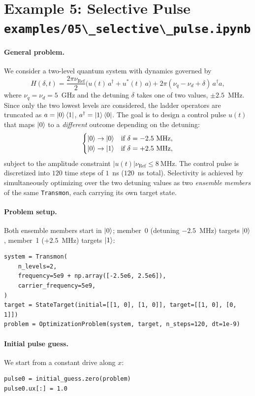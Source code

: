 \documentclass[a4paper,12pt]{article}
\DeclareMathOperator{\R}{Ref}
\newcommand{\mcode}[1]{\protect\lstinline[basicstyle=\color{black}\ttfamily]!#1!}
\begin{document}
\newpage
\section*{Example 5: Selective Pulse\\
\mcode{examples/05\_selective\_pulse.ipynb}}
{}

\paragraph*{General problem.}
We consider a two-level quantum system with dynamics governed by
\[
    H(\delta,t) = \frac{2\pi \nu_{\R}}{2}\big( u(t)\,a^{\dagger} + u^{*}(t)\,a \big)
    + 2\pi(\nu_q - \nu_d + \delta)\,a^{\dagger}a,
\]
where $\nu_q = \nu_d = 5$~GHz and the detuning $\delta$ takes one of two
values, $\pm 2.5$~MHz. Since only the two lowest levels are considered, the
ladder operators are truncated as $a=\ket{0}\bra{1}$,
$a^{\dagger}=\ket{1}\bra{0}$. The goal is to design a control pulse $u(t)$
that maps $\ket{0}$ to a \emph{different} outcome depending on the
detuning:
\[\begin{cases}
   \ket{0}\to\ket{0} & \text{if } \delta = -2.5~\mathrm{MHz}, \\
   \ket{0}\to\ket{1} & \text{if } \delta = +2.5~\mathrm{MHz},
\end{cases}
\]
subject to the amplitude constraint $|u(t)|\nu_{\R}\leq 8~\mathrm{MHz}$. The
control pulse is discretized into $120$ time steps of $1$~ns ($120$~ns
total). Selectivity is achieved by simultaneously optimizing over the two
detuning values as two \emph{ensemble members} of the same \mcode{Transmon},
each carrying its own target state.

\paragraph*{Problem setup.} Both ensemble members start in $\ket{0}$;
member~0 (detuning $-2.5$~MHz) targets $\ket{0}$, member~1 ($+2.5$~MHz)
targets $\ket{1}$:
\begin{lstlisting}
system = Transmon(
    n_levels=2,
    frequency=5e9 + np.array([-2.5e6, 2.5e6]),
    carrier_frequency=5e9,
)
target = StateTarget(initial=[[1, 0], [1, 0]], target=[[1, 0], [0, 1]])
problem = OptimizationProblem(system, target, n_steps=120, dt=1e-9)
\end{lstlisting}

\paragraph*{Initial pulse guess.} We start from a constant drive along $x$:
\begin{lstlisting}
pulse0 = initial_guess.zero(problem)
pulse0.ux[:] = 1.0
\end{lstlisting}
\end{document}

